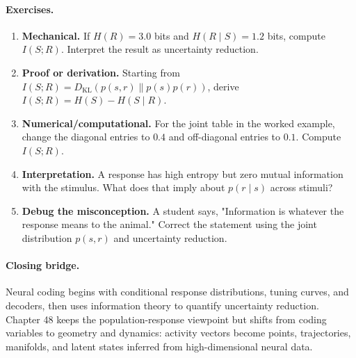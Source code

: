 \paragraph{Exercises.}
\begin{enumerate}[label=\textbf{47.4.\arabic*.}, leftmargin=*]
\item \textbf{Mechanical.} If \(H(R)=3.0\) bits and \(H(R\mid S)=1.2\) bits, compute \(I(S;R)\). Interpret the result as uncertainty reduction.
\item \textbf{Proof or derivation.} Starting from \(I(S;R)=D_{\mathrm{KL}}(p(s,r)\|p(s)p(r))\), derive \(I(S;R)=H(S)-H(S\mid R)\).
\item \textbf{Numerical/computational.} For the joint table in the worked example, change the diagonal entries to \(0.4\) and off-diagonal entries to \(0.1\). Compute \(I(S;R)\).
\item \textbf{Interpretation.} A response has high entropy but zero mutual information with the stimulus. What does that imply about \(p(r\mid s)\) across stimuli?
\item \textbf{Debug the misconception.} A student says, "Information is whatever the response means to the animal." Correct the statement using the joint distribution \(p(s,r)\) and uncertainty reduction.
\end{enumerate}

\paragraph{Closing bridge.}
Neural coding begins with conditional response distributions, tuning curves, and decoders, then uses information theory to quantify uncertainty reduction. Chapter 48 keeps the population-response viewpoint but shifts from coding variables to geometry and dynamics: activity vectors become points, trajectories, manifolds, and latent states inferred from high-dimensional neural data.

\clearpage
